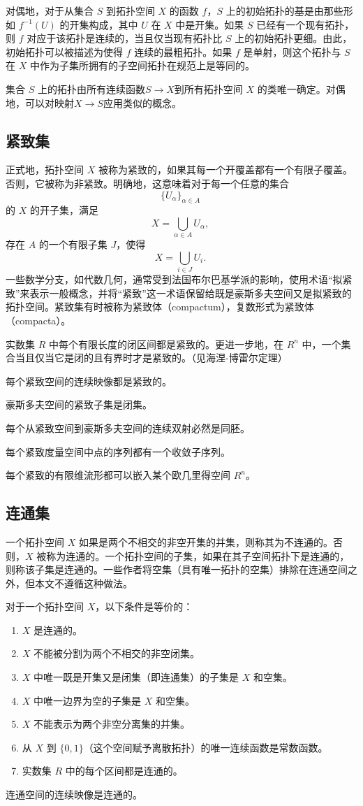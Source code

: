 对偶地，对于从集合 $S$ 到拓扑空间 $X$ 的函数 $f$，$S$ 上的初始拓扑的基是由那些形如 $f^{-1}(U)$ 的开集构成，其中 $U$ 在 $X$ 中是开集。如果 $S$ 已经有一个现有拓扑，则 $f$ 对应于该拓扑是连续的，当且仅当现有拓扑比 $S$ 上的初始拓扑更细。由此，初始拓扑可以被描述为使得 $f$ 连续的最粗拓扑。如果 $f$ 是单射，则这个拓扑与 $S$ 在 $X$ 中作为子集所拥有的子空间拓扑在规范上是等同的。

集合 $S$ 上的拓扑由所有连续函数$S \rightarrow X$到所有拓扑空间 $X$ 的类唯一确定。对偶地，可以对映射$X \rightarrow S$应用类似的概念。
\subsection{紧致集}
正式地，拓扑空间 $X$ 被称为紧致的，如果其每一个开覆盖都有一个有限子覆盖。否则，它被称为非紧致。明确地，这意味着对于每一个任意的集合
$$
\{ U_{\alpha} \}_{\alpha \in A}~
$$
的 $X$ 的开子集，满足
$$
X = \bigcup_{\alpha \in A} U_{\alpha},~
$$
存在 $A$ 的一个有限子集 $J$，使得
$$
X = \bigcup_{i \in J} U_i.~
$$
一些数学分支，如代数几何，通常受到法国布尔巴基学派的影响，使用术语“拟紧致”来表示一般概念，并将“紧致”这一术语保留给既是豪斯多夫空间又是拟紧致的拓扑空间。紧致集有时被称为紧致体（compactum），复数形式为紧致体（compacta）。

实数集 $R$ 中每个有限长度的闭区间都是紧致的。更进一步地，在 $R^n$ 中，一个集合当且仅当它是闭的且有界时才是紧致的。（见海涅-博雷尔定理）

每个紧致空间的连续映像都是紧致的。

豪斯多夫空间的紧致子集是闭集。

每个从紧致空间到豪斯多夫空间的连续双射必然是同胚。

每个紧致度量空间中点的序列都有一个收敛子序列。

每个紧致的有限维流形都可以嵌入某个欧几里得空间 $R^n$。
\subsection{连通集}
一个拓扑空间 $X$ 如果是两个不相交的非空开集的并集，则称其为不连通的。否则，$X$ 被称为连通的。一个拓扑空间的子集，如果在其子空间拓扑下是连通的，则称该子集是连通的。一些作者将空集（具有唯一拓扑的空集）排除在连通空间之外，但本文不遵循这种做法。

对于一个拓扑空间 $X$，以下条件是等价的：
\begin{enumerate}
\item $X$ 是连通的。
\item $X$ 不能被分割为两个不相交的非空闭集。
\item $X$ 中唯一既是开集又是闭集（即连通集）的子集是 $X$ 和空集。
\item $X$ 中唯一边界为空的子集是 $X$ 和空集。
\item $X$ 不能表示为两个非空分离集的并集。
\item 从 $X$ 到 $\{0,1\}$（这个空间赋予离散拓扑）的唯一连续函数是常数函数。
\item 实数集 $R$ 中的每个区间都是连通的。
\end{enumerate}
连通空间的连续映像是连通的。
